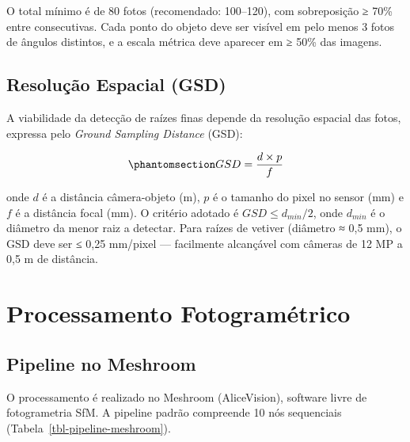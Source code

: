\documentclass[
  portuguese,
  11pt,
  a4paper,
  open=any]{scrbook}
\begin{document}
O total mínimo é de 80 fotos (recomendado: 100--120), com sobreposição ≥
70\% entre consecutivas. Cada ponto do objeto deve ser visível em pelo
menos 3 fotos de ângulos distintos, e a escala métrica deve aparecer em
≥ 50\% das imagens.

\subsection{Resolução Espacial
(GSD)}\label{resoluuxe7uxe3o-espacial-gsd}

A viabilidade da detecção de raízes finas depende da resolução espacial
das fotos, expressa pelo \emph{Ground Sampling Distance} (GSD):

\begin{equation}\phantomsection\label{eq-gsd-cap22}{GSD = \frac{d \times p}{f}}\end{equation}

onde \(d\) é a distância câmera-objeto (m), \(p\) é o tamanho do pixel
no sensor (mm) e \(f\) é a distância focal (mm). O critério adotado é
\(GSD \leq d_{min}/2\), onde \(d_{min}\) é o diâmetro da menor raiz a
detectar. Para raízes de vetiver (diâmetro ≈ 0,5 mm), o GSD deve ser ≤
0,25 mm/pixel --- facilmente alcançável com câmeras de 12 MP a 0,5 m de
distância.

\section{Processamento
Fotogramétrico}\label{processamento-fotogramuxe9trico}

\subsection{Pipeline no Meshroom}\label{pipeline-no-meshroom}

O processamento é realizado no Meshroom (AliceVision), software livre de
fotogrametria SfM. A pipeline padrão compreende 10 nós sequenciais
(Tabela~\ref{tbl-pipeline-meshroom}).
\end{document}
